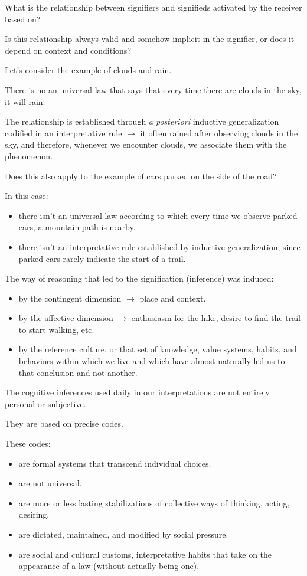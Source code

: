 What is the relationship between signifiers and signifieds activated by the receiver based  on?

Is this relationship always valid and somehow implicit in the signifier, or does it depend on context and conditions?

Let's consider the example of clouds and rain.

There is no an universal law that says that every time there are clouds in the sky, it will rain.

The relationship is established through \textit{a posteriori} inductive generalization codified in an interpretative rule \(\rightarrow\) it often rained after observing clouds in the sky, and therefore, whenever we encounter clouds, we associate them with the phenomenon.

Does this also apply to the example of cars parked on the side of the road?

In this case:

\begin{itemize}
\tightlist\item there isn't an universal law according to which every time we observe parked cars, a mountain path is nearby.
\item there isn't an interpretative rule established by inductive generalization, since parked cars rarely indicate the start of a trail.
\end{itemize}

The way of reasoning that led to the signification (inference) was induced:

\begin{itemize}
\tightlist\item by the contingent dimension \(\rightarrow\) place and context.
\item by the affective dimension \(\rightarrow\) enthusiasm for the hike, desire to find the trail to start walking, etc.
\item by the reference culture, or that set of knowledge, value systems, habits, and behaviors within which we live and which have almost naturally led us to that conclusion and not another.
\end{itemize}

The cognitive inferences used daily in our interpretations are not entirely personal or subjective. 

They are based on precise codes.

These codes:

\begin{itemize}
\tightlist\item are formal systems that transcend individual choices.
\item are not universal.
\item are more or less lasting stabilizations of collective ways of thinking, acting, desiring.
\item are dictated, maintained, and modified by social pressure.
\item are social and cultural customs, interpretative habits that take on the appearance of a law (without actually being one).
\end{itemize}

